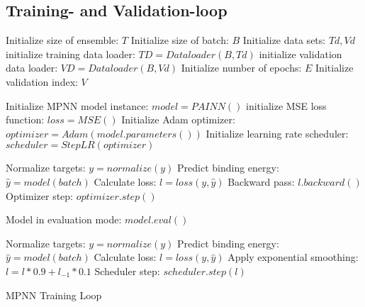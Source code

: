 
\subsection{Training- and Validation-loop}\label{subsec:training}

\begin{algorithm}[H]
    \begin{algorithmic}[1]
        \State Initialize size of ensemble: $T$
        \State Initialize size of batch: $B$
        \State Initialize data sets: $Td, Vd$
        \State initialize training data loader: $TD = Dataloader(B,Td)$
        \State initialize validation data loader: $VD = Dataloader(B,Vd)$
        \State Initialize number of epochs: $E$
        \State Initialize validation index: $V$


        \State Initialize MPNN model instance: $model = PAINN()$
        \State initialize MSE loss function: $loss = MSE()$
        \State Initialize Adam optimizer: $optimizer = Adam(model.parameters())$
        \State Initialize learning rate scheduler: $scheduler = StepLR(optimizer)$



        \State Normalize targets: $y = normalize(y)$
        \State Predict binding energy: $\hat{y} = model(batch)$
        \State Calculate loss: $l = loss(y,\hat{y})$
        \State Backward pass: $l.backward()$
        \State Optimizer step: $optimizer.step()$

        \State Model in evaluation mode: $model.eval()$


        \State Normalize targets: $y = normalize(y)$
        \State Predict binding energy: $\hat{y} = model(batch)$
        \State Calculate loss: $l = loss(y,\hat{y})$
        \State Apply exponential smoothing: $l = l * 0.9 + l_{-1} * 0.1$
        \State Scheduler step: $scheduler.step(l)$
        \EndFor

        \EndIf
        \EndFor
        \EndFor
        \EndFor
    \end{algorithmic}
    \caption{MPNN Training Loop}
    \label{algo:MPNN_training}
\end{algorithm}

